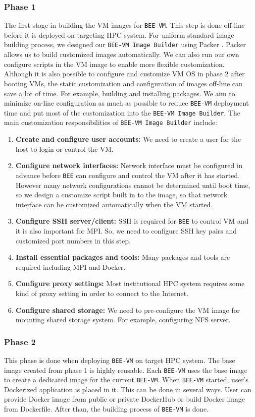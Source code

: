\subsubsection{Phase 1}
The first stage in building the VM images for  \texttt{BEE-VM}. This step is done off-line before it is deployed on targeting HPC system. For uniform standard image building process, we designed our \texttt{BEE-VM Image Builder} using Packer \cite{packer}. Packer allows us to build customized images automatically. We can also run our own configure scripts in the VM image to enable more flexible customization. Although it is also possible to configure and customize VM OS in phase 2 after booting VMs, the static customization and configuration of images off-line can save a lot of time. For example, building and installing packages. We aim to minimize on-line configuration as much as possible to reduce \texttt{BEE-VM} deployment time and put most of the customization into the \texttt{BEE-VM Image Builder}. The main customization responsibilities of \texttt{BEE-VM Image Builder} include:
\begin{enumerate}
\item \textbf{Create and configure user accounts:} We need to create a user for the host to login or control the VM.
\item \textbf{Configure network interfaces:} Network interface must be configured in advance before \texttt{BEE} can configure and control the VM after it has started. However many network configurations cannot be determined until boot time, so we design a customize script built in to the image, so that network interface can be customized automatically when the VM started.
\item \textbf{Configure SSH server/client:} SSH is required for \texttt{BEE} to control VM and it is also important for MPI. So, we need to configure SSH key pairs and customized port numbers in this step.
\item \textbf{Install essential packages and tools:} Many packages and tools are required including MPI and Docker.
\item \textbf{Configure proxy settings:} Most institutional HPC system requires some kind of proxy setting in order to connect to the Internet. 
\item \textbf{Configure shared storage:} We need to pre-configure the VM image for mounting shared storage system. For example, configuring NFS server.
\end{enumerate} 

\subsubsection{Phase 2}
This phase is done when deploying \texttt{BEE-VM} on target HPC system. The base image created from phase 1 is highly reusable. Each \texttt{BEE-VM} uses the base image to create a dedicated image for the current \texttt{BEE-VM}. When \texttt{BEE-VM} started, user's Dockerized application is placed in it. This can be done in several ways. User can provide Docker image from public or private DockerHub or build Docker image from Dockerfile. After than, the building process of \texttt{BEE-VM} is done.

